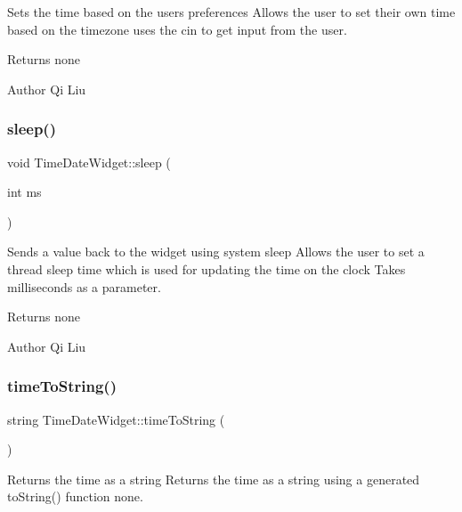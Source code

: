 Sets the time based on the user\textquotesingle{}s preferences  Allows the user to set their own time based on the timezone  uses the cin to get input from the user. 

\begin{DoxyReturn}{Returns}
none 
\end{DoxyReturn}
\begin{DoxyAuthor}{Author}
Qi Liu 
\end{DoxyAuthor}
\mbox{\label{class_time_date_widget_aae23752646a1d3d0185118a50c2f6029}} 
\subsubsection{\texorpdfstring{sleep()}{sleep()}}
{\footnotesize\ttfamily void Time\+Date\+Widget\+::sleep (\begin{DoxyParamCaption}\item[{int}]{ms }\end{DoxyParamCaption})}



Sends a value back to the widget using system sleep  Allows the user to set a thread sleep time which is used for updating the time on the clock  Takes milliseconds as a parameter. 

\begin{DoxyReturn}{Returns}
none 
\end{DoxyReturn}
\begin{DoxyAuthor}{Author}
Qi Liu 
\end{DoxyAuthor}
\mbox{\label{class_time_date_widget_ae492dd2f58b16b38decd4f4602b08dea}} 
\subsubsection{\texorpdfstring{time\+To\+String()}{timeToString()}}
{\footnotesize\ttfamily string Time\+Date\+Widget\+::time\+To\+String (\begin{DoxyParamCaption}{ }\end{DoxyParamCaption})}



Returns the time as a string  Returns the time as a string using a generated to\+String() function  none. 


